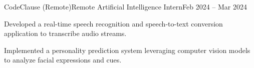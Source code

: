 \resumeSubheading
  {CodeClause (Remote)}{Remote}
  {Artificial Intelligence Intern}{Feb 2024 -- Mar 2024}
  \resumeItemListStart
    \item \small{Developed a real-time speech recognition and speech-to-text conversion application to transcribe audio streams.}
    \item \small{Implemented a personality prediction system leveraging computer vision models to analyze facial expressions and cues.}
  \resumeItemListEnd
